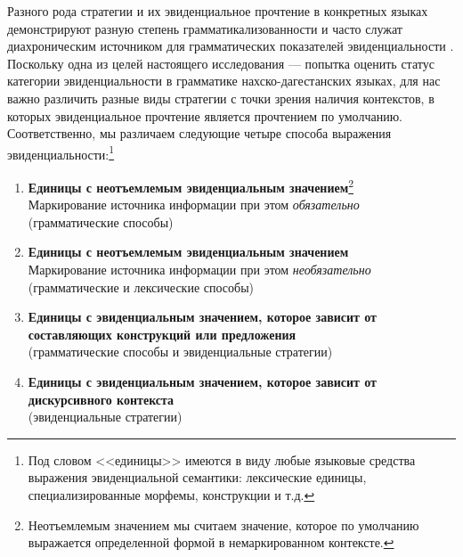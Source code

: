 Разного рода стратегии и их эвиденциальное прочтение в конкретных языках демонстрируют разную степень грамматикализованности и часто служат диахроническим источником для грамматических показателей эвиденциальности \citep[267--280]{aikhenvald2004}. Поскольку одна из целей настоящего исследования --- попытка оценить статус категории эвиденциальности в грамматике нахско-дагестанских языках, для нас важно различить разные виды стратегии с точки зрения наличия контекстов, в которых эвиденциальное прочтение является прочтением по умолчанию. Соответственно, мы различаем следующие четыре способа выражения эвиденциальности:\footnote{Под словом <<единицы>> имеются в виду любые языковые средства выражения эвиденциальной семантики: лексические единицы, специализированные морфемы, конструкции и т.д.}

\begin{enumerate}
    \item \textbf{Единицы с неотъемлемым эвиденциальным значением}\footnote{Неотъемлемым значением мы считаем значение, которое по умолчанию выражается определенной формой в немаркированном контексте.}\\
    Маркирование источника информации при этом \textit{обязательно}\\
    (грамматические способы)
    \item \textbf{Единицы с неотъемлемым эвиденциальным значением}\\
    Маркирование источника информации при этом \textit{необязательно}\\
    (грамматические и лексические способы)
    \item \textbf{Единицы с эвиденциальным значением, которое зависит от составляющих конструкций или предложения}\\
    (грамматические способы и эвиденциальные стратегии)
    \item \textbf{Единицы с эвиденциальным значением, которое зависит от дискурсивного контекста}\\
    (эвиденциальные стратегии)
\end{enumerate}

